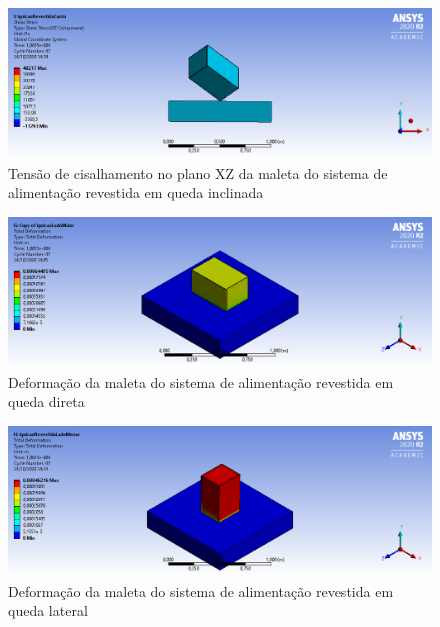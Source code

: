 \begin{apendicesenv}
\begin{figure}[htb]
    \centering
    \includegraphics[width=1.0\textwidth, angle=0]{figuras/estrutura_simulacaoImpacto/ignicaoRevestidaCisalhamentoXZCanto.png}
    \caption{Tensão de cisalhamento no plano XZ da maleta do sistema de alimentação revestida em queda inclinada}
    \label{fig:simulacaoImpacto_15}
\end{figure}

\begin{figure}[htb]
    \centering
    \includegraphics[width=1.0\textwidth, angle=0]{figuras/estrutura_simulacaoImpacto/ignicaoRevestidaDeformacaoMaior.png}
    \caption{Deformação da maleta do sistema de alimentação revestida em queda direta}
    \label{fig:simulacaoImpacto_16}
\end{figure}

\begin{figure}[htb]
    \centering
    \includegraphics[width=1.0\textwidth, angle=0]{figuras/estrutura_simulacaoImpacto/ignicaoRevestidaDeformacaoMenor.png}
    \caption{Deformação da maleta do sistema de alimentação revestida em queda lateral}
    \label{fig:simulacaoImpacto_17}
\end{figure}


\end{apendicesenv}
